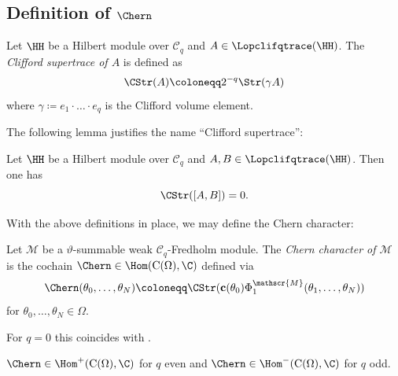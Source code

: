 \documentclass[a4paper, english, 12pt, bibliography=totocnumbered,
index=totoc]{scrartcl}
\begin{document}
\subsection{Definition of \texorpdfstring{$\Chern$}{ChernM}}
\begin{defn}
	Let $\HH$ be a Hilbert module over $\mathcal{C}_q$ and $A \in
	\Lopclifqtrace(\HH)$.
	The \textit{Clifford supertrace of $A$} is defined as
	\begin{equation*}
		\CStr(A) \coloneqq 2^{-q}\Str(\gamma A)
	\end{equation*}
	where $\gamma \coloneqq e_1 \cdot \ldots \cdot e_q$ is the Clifford volume
	element.
\end{defn}
The following lemma justifies the name \enquote{Clifford supertrace}:
\begin{lem}\label{Clifford trace is trace}
	Let $\HH$ be a Hilbert module over $\mathcal{C}_q$ and $A, B \in
	\Lopclifqtrace(\HH)$.
	Then one has
	\begin{equation*}
		\CStr([A, B]) = 0.
	\end{equation*}
\end{lem}
With the above definitions in place, we may define the Chern character:
\begin{defn}
	Let $\mathscr{M}$ be a $\vartheta$-summable weak $\mathcal{C}_q$-Fredholm
	module.
	The \textit{Chern character of $\mathscr{M}$} is the cochain $\Chern \in
	\Hom(\mathrm{C}(\Omega), \C)$ defined via
	\begin{equation*}\label{Definition Chern character of FM}
		\Chern(\theta_0, \ldots, \theta_N) \coloneqq
		\CStr(\mathbf{c}(\theta_0)
		\Phi_1^{\mathscr{M}}(\theta_1, \ldots, \theta_N))
	\end{equation*}
	for $\theta_0, \ldots, \theta_N \in \Omega$.
\end{defn}
\begin{rem}
	For $q = 0$ this coincides with \cite[Definition 5.1]{GüneysuLudewig}.
\end{rem}
\begin{lem}\label{Chern even/odd}
	$\Chern \in \Hom^+(\mathrm{C}(\Omega), \C)$ for $q$ even and $\Chern \in
	\Hom^-(\mathrm{C}(\Omega), \C)$ for $q$ odd.
\end{lem}
\end{document}
